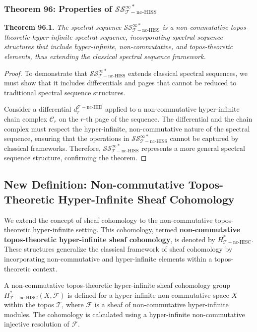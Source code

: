 \documentclass{article}
\begin{document}
\subsubsection{Theorem 96: Properties of \(\mathcal{SS}_{\mathcal{T}-\text{nc-HISS}}^{\infty *}\)}
\textbf{Theorem 96.1.} \textit{The spectral sequence \(\mathcal{SS}_{\mathcal{T}-\text{nc-HISS}}^{\infty *}\) is a non-commutative topos-theoretic hyper-infinite spectral sequence, incorporating spectral sequence structures that include hyper-infinite, non-commutative, and topos-theoretic elements, thus extending the classical spectral sequence framework.}

\begin{proof}
To demonstrate that \(\mathcal{SS}_{\mathcal{T}-\text{nc-HISS}}^{\infty *}\) extends classical spectral sequences, we must show that it includes differentials and pages that cannot be reduced to traditional spectral sequence structures.

Consider a differential \(d_{r}^{\mathcal{T}-\text{nc-HID}}\) applied to a non-commutative hyper-infinite chain complex \(\mathcal{C}_r\) on the \(r\)-th page of the sequence. The differential and the chain complex must respect the hyper-infinite, non-commutative nature of the spectral sequence, ensuring that the operations in \(\mathcal{SS}_{\mathcal{T}-\text{nc-HISS}}^{\infty *}\) cannot be captured by classical frameworks. Therefore, \(\mathcal{SS}_{\mathcal{T}-\text{nc-HISS}}^{\infty *}\) represents a more general spectral sequence structure, confirming the theorem.
\end{proof}

\subsection{New Definition: Non-commutative Topos-Theoretic Hyper-Infinite Sheaf Cohomology}
We extend the concept of sheaf cohomology to the non-commutative topos-theoretic hyper-infinite setting. This cohomology, termed \textbf{non-commutative topos-theoretic hyper-infinite sheaf cohomology}, is denoted by \(H_{\mathcal{T}-\text{nc-HISC}}^{*}\). These structures generalize the classical framework of sheaf cohomology by incorporating non-commutative and hyper-infinite elements within a topos-theoretic context.

A non-commutative topos-theoretic hyper-infinite sheaf cohomology group \(H_{\mathcal{T}-\text{nc-HISC}}^{*}(X, \mathcal{F})\) is defined for a hyper-infinite non-commutative space \(X\) within the topos \(\mathcal{T}\), where \(\mathcal{F}\) is a sheaf of non-commutative hyper-infinite modules. The cohomology is calculated using a hyper-infinite non-commutative injective resolution of \(\mathcal{F}\).
\end{document}
